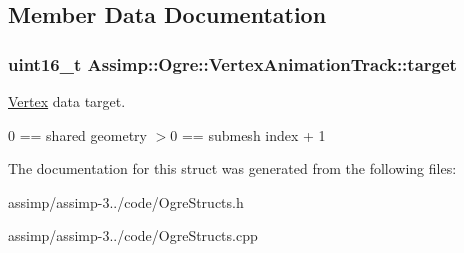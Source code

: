 \subsection{Member Data Documentation}
\hypertarget{struct_assimp_1_1_ogre_1_1_vertex_animation_track_a1d6b6d6fdedfbae0ca8ef52775ace266}{
\subsubsection[{target}]{\setlength{\rightskip}{0pt plus 5cm}uint16\+\_\+t Assimp\+::\+Ogre\+::\+Vertex\+Animation\+Track\+::target}}\label{struct_assimp_1_1_ogre_1_1_vertex_animation_track_a1d6b6d6fdedfbae0ca8ef52775ace266}


\hyperlink{class_assimp_1_1_vertex}{Vertex} data target. 

0 == shared geometry $>$0 == submesh index + 1 

The documentation for this struct was generated from the following files\+:\begin{DoxyCompactItemize}
\item 
assimp/assimp-\/3../code/Ogre\+Structs.\+h\item 
assimp/assimp-\/3../code/Ogre\+Structs.\+cpp\end{DoxyCompactItemize}
